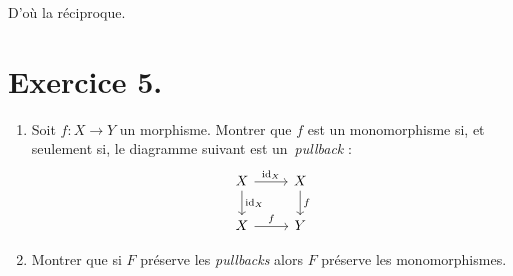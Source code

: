 \documentclass{../../td}
\begin{document}
  D'où la réciproque.


  \chapter{Exercice 5.}

  \begin{slshape}
    \color{deepblue}
    \begin{enumerate}
      \item Soit $f : X \to Y$ un morphisme.
        Montrer que $f$ est un monomorphisme si, et seulement si, le diagramme suivant est un~\textit{pullback} :
        \begin{equation}
        \begin{tikzcd}
          X \arrow{r}{\mathrm{id}_X} \arrow{d}{\mathrm{id}_X} & X\arrow{d}{f}\\
          X \arrow{r}{f} & Y
        \end{tikzcd}
        \label{ex5-diag1}
        \end{equation}
      \item Montrer que si $F$ préserve les \textit{pullbacks} alors $F$ préserve les monomorphismes.
    \end{enumerate}
  \end{slshape}
\end{document}
